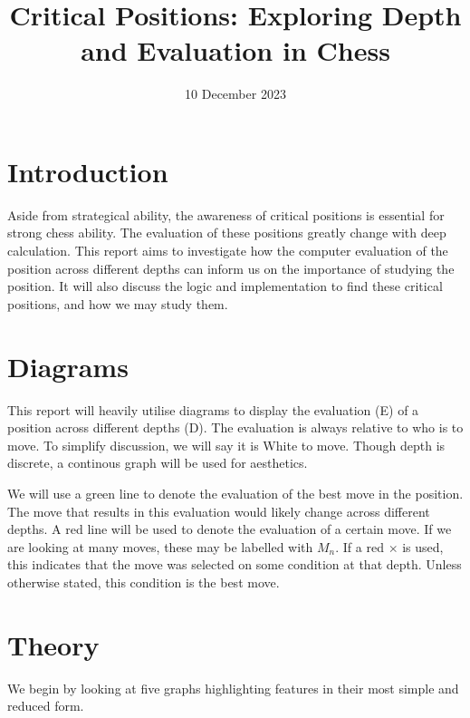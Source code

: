 \documentclass{article}
\title{Critical Positions: Exploring Depth and Evaluation in Chess}
\date{10 December 2023}
\begin{document}
\maketitle

\section{Introduction}
Aside from strategical ability, the awareness of critical positions is essential for strong chess ability. The evaluation of these positions greatly change with deep calculation. This report aims to investigate how the computer evaluation of the position across different depths can inform us on the importance of studying the position. It will also discuss the logic and implementation to find these critical positions, and how we may study them.

\section{Diagrams}
This report will heavily utilise diagrams to display the evaluation (E) of a position across different depths (D). The evaluation is always relative to who is to move. To simplify discussion, we will say it is White to move. Though depth is discrete, a continous graph will be used for aesthetics.

\begin{center}
\end{center}

We will use a green line to denote the evaluation of the best move in the position. The move that results in this evaluation would likely change across different depths. A red line will be used to denote the evaluation of a certain move. If we are looking at many moves, these may be labelled with $M_n$. If a red $\times$ is used, this indicates that the move was selected on some condition at that depth. Unless otherwise stated, this condition is the best move.

\section{Theory}
We begin by looking at five graphs highlighting features in their most simple and reduced form.
\end{document}
